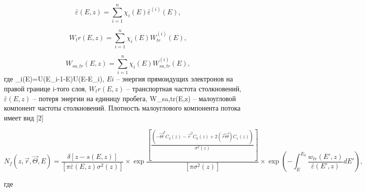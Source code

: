 \begin{equation}
\bar{\varepsilon}(E,z)=\sum_{i=1}^n \chi_i (E)\bar{\varepsilon}^{(i)} (E),
\label{eq:2}
\end{equation}

\begin{equation}
W_tr(E,z)=\sum_{i=1}^n \chi_i (E)W_{tr}^{(i)} (E),
\label{eq:3}
\end{equation}

\begin{equation}
W_{sa,tr}(E,z)=\sum_{i=1}^n \chi_i (E)W_{sa,tr}^{(i)} (E),
\label{eq:4}
\end{equation}
где
\chi_i(E)=U(E_{i-1}-E)U(E-E_i),
$Ei$ – энергия прямоидущих электронов на правой границе i-того слоя, $W_tr(E,z)$ –
транспортная частота столкновений, $\bar{\varepsilon}(E,z)$ – потеря энергии на единицу пробега, W_{sa,tr}(E,z) – малоугловой компонент частоты столкновений.
Плотность малоуглового компонента потока имеет вид [2]

\begin{equation}
N_f(z,\vec{r},\vec{\Theta},E)=\frac{\delta[z-s(E,z)]}{[\pi \bar{\varepsilon}(E,z)\sigma^2(z)]}\times \exp \frac{[\frac{(-\vec{\Theta}^2 C_2(z)-\vec{r}^2C_0 (z)+2(\vec{r}\vec{\Theta})C_1(z))}{\sigma^2(z)}]}{[\pi\sigma^2(z)]} \times \exp\left(-\int_{E}^{E_0} \frac{w_{tr}(E',z)}{\bar{\varepsilon}(E',z)}dE'\right),
\label{eq:6}
\end{equation}

где



